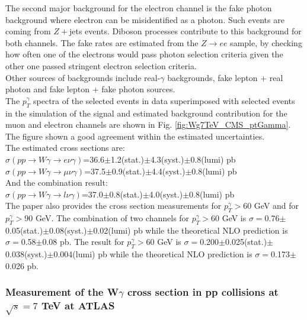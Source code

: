 The second major background for the electron channel is the fake photon background where electron can be misidentified as a photon. Such events are coming from $Z+$jets events. Diboson processes contribute to this background for both channels. The fake rates are estimated from the $Z\rightarrow ee$ sample, by checking how often one of the electrons would pass photon selection criteria given the other one passed stringent electron selection criteria.\\

Other sources of backgrounds include real-$\gamma$ backgrounds, fake lepton + real photon and fake lepton + fake photon sources.\\ 

The $p_T^\gamma$ spectra of the selected events in data superimposed with selected events in the simulation of the signal and estimated background contribution for the muon and electron channels are shown in Fig. \ref{fig:Wg7TeV_CMS_ptGamma}. The figure shown a good agreement within the estimated uncertainties.\\

The estimated cross sections are:\\
$\sigma(pp\rightarrow W\gamma \rightarrow e\nu\gamma)$=36.6$\pm$1.2(stat.)$\pm$4.3(syst.)$\pm$0.8(lumi) pb\\
$\sigma(pp\rightarrow W\gamma \rightarrow \mu\nu\gamma)$=37.5$\pm$0.9(stat.)$\pm$4.4(syst.)$\pm$0.8(lumi) pb\\
And the combination result:\\
$\sigma(pp\rightarrow W\gamma \rightarrow l\nu\gamma)$=37.0$\pm$0.8(stat.)$\pm$4.0(syst.)$\pm$0.8(lumi) pb\\

The paper also provides the cross section measurements for $p_T^\gamma>$60 GeV and for $p_T^\gamma>$90 GeV. The combination of two channels for $p_T^\gamma>$60 GeV is $\sigma=$0.76$\pm$0.05(stat.)$\pm$0.08(syst.)$\pm$0.02(lumi) pb while the theoretical NLO prediction is $\sigma=$0.58$\pm$0.08 pb. The result for $p_T^\gamma>$60 GeV is $\sigma=$0.200$\pm$0.025(stat.)$\pm$0.038(syst.)$\pm$0.004(lumi) pb while the theoretical NLO prediction is $\sigma=$0.173$\pm$0.026 pb.\\


\subsubsection{Measurement of the W$\gamma$ cross section in pp collisions at $\sqrt{s}=7$ TeV at ATLAS}

